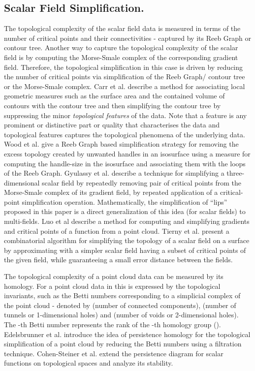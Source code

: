 \documentclass[twocolumn]{article}
\begin{document}
\subsection*{Scalar Field Simplification.} 
The topological complexity of the scalar field data is measured in
terms of the number of critical points and their connectivities -
captured by its Reeb Graph or contour tree.  Another way to capture
the topological complexity of the scalar field is by computing the Morse-Smale complex of the corresponding
gradient field. Therefore, the topological simplification
in this case is driven by reducing the number of critical points via
simplification of the Reeb Graph/ contour tree or the Morse-Smale complex.
Carr et al. \cite{2004-Carr-simplification} describe a method for associating local geometric measures such
  as the surface area and the contained volume of contours with the contour
  tree and then simplifying the contour tree by suppressing the minor
  \emph{topological features} of the data. Note that  a feature is any
  prominent or distinctive part or quality that characterises the data
  and topological features captures the topological phenomena of the underlying data.  Wood et al. \cite{2004-Wood-excessTopo} give a
  Reeb Graph based simplification strategy for removing the excess
  topology created by unwanted handles in an isosurface using a
  measure for computing the handle-size in the isosurface and associating them
  with the loops of the Reeb Graph. Gyulassy et al. \cite{2006-Gyulassy} describe a
  technique for simplifying a three-dimensional scalar field by
  repeatedly removing pair of critical points from the Morse-Smale
  complex of its gradient field, by repeated application of a critical-point
  simplification operation. Mathematically, the simplification of
  ``lips'' proposed in this paper is a direct generalization of this
  idea (for scalar fields) to multi-fields. 
Luo et al \cite{2009-Luo-Jacobi} describe a method for computing and simplifying gradients and critical points of a function from a
point cloud. Tierny et al. \cite{2012-Tierny-tvcg} present a
  combinatorial algorithm for simplifying the topology of a scalar field on a surface
  by approximating with a simpler scalar field having a subset of
  critical points of the given field, while guaranteeing a small error distance
  between the fields.

The topological complexity of a point cloud
data can be measured by its homology. For a point cloud data  in
 this is expressed by the topological invariants, such as the Betti
numbers corresponding to a simplicial complex of the point cloud
 - denoted by  (number of connected components),  (number of
 tunnels or 1-dimensional holes) and
 (number of voids or 2-dimensional holes).  The -th Betti number represents the
rank of the -th homology group (). Edelsbrunner et al. \cite{2002-Edels-Persist} introduce the
idea of persistence homology for the topological simplification of a
point cloud by reducing the Betti numbers using a filtration
technique. Cohen-Steiner et al. \cite{2007-Cohen-Steiner} extend the persistence diagram
for scalar functions on topological spaces and analyze its
stability. 
\end{document}
